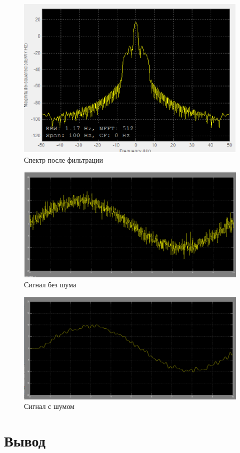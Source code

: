 \begin{figure}[H]
   \includegraphics[scale=0.7]{lab6/7.png}
   \caption{Спектр после фильтрации}
\end{figure}
\begin{figure}[H]
   \includegraphics[scale=0.7]{lab6/8.png}
   \caption{Сигнал без шума}
\end{figure}

\begin{figure}[H]
   \includegraphics[scale=0.7]{lab6/9.png}
   \caption{Сигнал с шумом}
\end{figure}

\section{Вывод}

